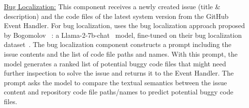 \underline{Bug Localization:} This component receives a newly created issue (title \& description) and the code files of the latest system version from the GitHub Event Handler. For bug localization, \toolname uses the bug localization approach proposed by Bogomolov \etal~\cite{longCodeArena}: a Llama-2-7b-chat~\cite{llama-2} model, fine-tuned on their bug localization dataset~\cite{longCodeBLDataset}. 
The bug localization component constructs a prompt including the issue contents and the list of code file paths and names. With this prompt, the model generates a ranked list of potential buggy code files that might need further inspection to solve the issue and returns it to the Event Handler. The prompt asks the model to compare the textual semantics between the issue content and repository code file paths/names to predict potential buggy code files.

